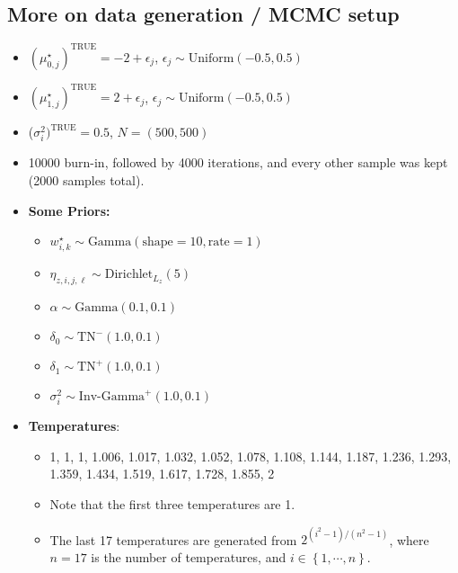 \documentclass[10pt]{article} %
\newcommand{\bc}[1]{ \left\{#1\right\} }
\newcommand{\Gam}{ \text{Gamma} }
\newcommand{\InvGamma}{ \text{Inv-Gamma} }
\newcommand{\Uniform}{ \text{Uniform} }
\def\Dir{\text{Dirichlet}}
\def\TN{\text{TN}}
\def\true{\text{TRUE}}
\begin{document}
\subsection{More on data generation / MCMC setup}
\begin{itemize}
  \item $(\mu_{0,j}^\star)^\true=-2 + \epsilon_j$, $\epsilon_j \sim \Uniform(-0.5, 0.5)$
  \item $(\mu_{1,j}^\star)^\true=2 + \epsilon_j$, $\epsilon_j \sim \Uniform(-0.5, 0.5)$
  \item ($\sigma^2_i)^\true=0.5$, $N=(500, 500)$
  \item 10000 burn-in, followed by 4000 iterations, and every other sample was
    kept (2000 samples total).
  \item \textbf{Some Priors:}
  \begin{itemize}
    \item $w^\star_{i,k} \sim \Gam(\text{shape}=10, \text{rate}=1)$
    \item $\eta_{z, i,j,\ell} \sim \Dir_{L_z}(5)$
    \item $\alpha \sim \Gam(0.1, 0.1)$
    \item $\delta_0 \sim \TN^-(1.0, 0.1)$
    \item $\delta_1 \sim \TN^+(1.0, 0.1)$
    \item $\sigma^2_i \sim \InvGamma^+(1.0, 0.1)$
  \end{itemize}
\item \textbf{Temperatures}: 
    \begin{itemize}
      \item 
        1, 1, 1, 1.006, 1.017,
        1.032, 1.052, 1.078,
        1.108, 1.144, 1.187,
        1.236, 1.293, 1.359,
        1.434, 1.519, 1.617,
        1.728, 1.855, 2
      \item Note that the first three temperatures are 1.
      \item The last 17 temperatures are generated from $2^{(i^2 - 1) / (n^2 -
        1)}$, where $n=17$ is the number of temperatures, and
        $i\in\bc{1,\cdots,n}$.
    \end{itemize}
\end{itemize}

\end{document}
